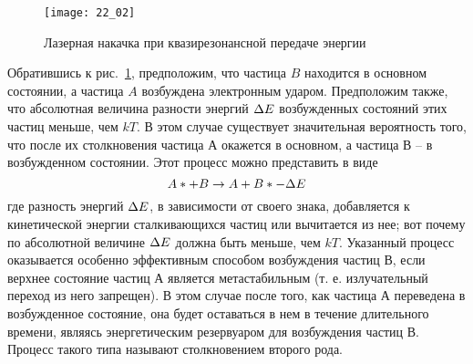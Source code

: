 \begin{figure}[h!]
    \center
    \texttt{[image: 22\_02]}
    \caption{Лазерная накачка при квазирезонансной передаче энергии}
    \label{img22.2}
\end{figure}

Обратившись к рис.~\ref{img22.2}, предположим, что частица \( B \) находится в 
основном состоянии, а частица \( A \) возбуждена электронным ударом. Предположим 
также, что абсолютная величина разности энергий \( \Delta E \) возбужденных 
состояний этих частиц меньше, чем \( kT \). В этом случае существует 
значительная вероятность того, что после их столкновения частица \( А \) 
окажется в основном, а частица \( В \) -- в возбужденном состоянии. Этот 
процесс можно представить в виде
\[
	A* + B \rightarrow A + B* - \Delta E
\]
где разность энергий \( \Delta E \), в зависимости от своего знака, добавляется к 
кинетической энергии сталкивающихся частиц или вычитается из нее; вот почему 
по абсолютной величине \( \Delta E \) должна быть меньше, чем \( kT \). Указанный
процесс оказывается особенно эффективным способом возбуждения частиц \( В \), 
если верхнее состояние частиц \( А \) является метастабильным (т. е. 
излучательный переход из него запрещен). В этом случае после того, как частица 
\( А \) переведена в возбужденное состояние, она будет оставаться в нем в 
течение длительного времени, являясь энергетическим резервуаром для 
возбуждения частиц \( В \). Процесс такого типа называют столкновением второго 
рода.